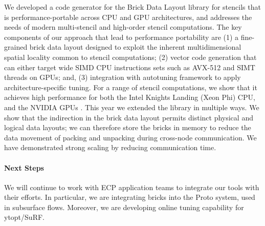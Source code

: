 We developed a code generator for the Brick Data Layout library for stencils
that is performance-portable across CPU and GPU architectures, and addresses the
needs of modern multi-stencil and high-order stencil computations. The key
components of our approach that lead to performance portability are (1) a
fine-grained brick data layout designed to exploit the inherent multidimensional
spatial locality common to stencil computations; (2) vector code generation that
can either target wide SIMD CPU instructions sets such as AVX-512 and SIMT
threads on GPUs; and, (3) integration with autotuning framework to apply
architecture-specific tuning. For a range of stencil computations, we show that
it achieves high performance for both the Intel Knights Landing (Xeon Phi) CPU,
and the NVIDIA GPUs \cite{P3HPC_Bricks,zhao2019}. This year we extended the library in multiple ways.
We show that the indirection in the brick data layout permits distinct physical and logical data layouts; we can
therefore store the bricks in memory to reduce the data movement of packing and unpacking during cross-node
communication.  We have demonstrated strong scaling by reducing communication time.  

\paragraph{Next Steps}

We will continue to work with ECP application teams to integrate our tools with their efforts.  In particular,
we are integrating bricks into the Proto system, used in subsurface flows.
Moreover, we are developing online tuning capability for ytopt/SuRF. 
